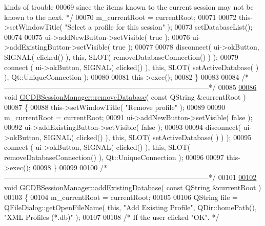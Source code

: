 \begin{DoxyCode}
{       kinds of trouble}
00069 \textcolor{comment}{    since the items known to the current session may not be known to the next. 
      */}
00070   m\_currentRoot = currentRoot;
00071 
00072   this->setWindowTitle( \textcolor{stringliteral}{"Select a profile for this session"} );
00073   setDatabaseList();
00074 
00075   ui->addNewButton->setVisible( \textcolor{keyword}{true} );
00076   ui->addExistingButton->setVisible( \textcolor{keyword}{true} );
00077 
00078   disconnect( ui->okButton, SIGNAL( clicked() ), \textcolor{keyword}{this}, SLOT( 
      removeDatabaseConnection() ) );
00079   connect   ( ui->okButton, SIGNAL( clicked() ), \textcolor{keyword}{this}, SLOT( setActiveDatabase(
      ) ), Qt::UniqueConnection );
00080 
00081   this->exec();
00082 \}
00083 
00084 \textcolor{comment}{/*
      --------------------------------------------------------------------------------------*/}
00085 
\hypertarget{gcdbsessionmanager_8cpp_source_l00086}{}\hyperlink{class_g_c_d_b_session_manager_a0fc44e9d2efb407cc0964295920b2432}{00086} \textcolor{keywordtype}{void} \hyperlink{class_g_c_d_b_session_manager_a0fc44e9d2efb407cc0964295920b2432}{GCDBSessionManager::removeDatabase}( \textcolor{keyword}{const} QString &currentRoot )
00087 \{
00088   this->setWindowTitle( \textcolor{stringliteral}{"Remove profile"} );
00089 
00090   m\_currentRoot = currentRoot;
00091   ui->addNewButton->setVisible( \textcolor{keyword}{false} );
00092   ui->addExistingButton->setVisible( \textcolor{keyword}{false} );
00093 
00094   disconnect( ui->okButton, SIGNAL( clicked() ), \textcolor{keyword}{this}, SLOT( setActiveDatabase(
      ) ) );
00095   connect   ( ui->okButton, SIGNAL( clicked() ), \textcolor{keyword}{this}, SLOT( 
      removeDatabaseConnection() ), Qt::UniqueConnection );
00096 
00097   this->exec();
00098 \}
00099 
00100 \textcolor{comment}{/*
      --------------------------------------------------------------------------------------*/}
00101 
\hypertarget{gcdbsessionmanager_8cpp_source_l00102}{}\hyperlink{class_g_c_d_b_session_manager_a52f3407b7ad5cac7c8c422d2528b28fc}{00102} \textcolor{keywordtype}{void} \hyperlink{class_g_c_d_b_session_manager_a52f3407b7ad5cac7c8c422d2528b28fc}{GCDBSessionManager::addExistingDatabase}( \textcolor{keyword}{const} QString &currentRoot )
00103 \{
00104   m\_currentRoot = currentRoot;
00105 
00106   QString file = QFileDialog::getOpenFileName( \textcolor{keyword}{this}, \textcolor{stringliteral}{"Add Existing Profile"}, 
      QDir::homePath(), \textcolor{stringliteral}{"XML Profiles (*.db)"} );
00107 
00108   \textcolor{comment}{/* If the user clicked "OK". */}

\end{DoxyCode}
